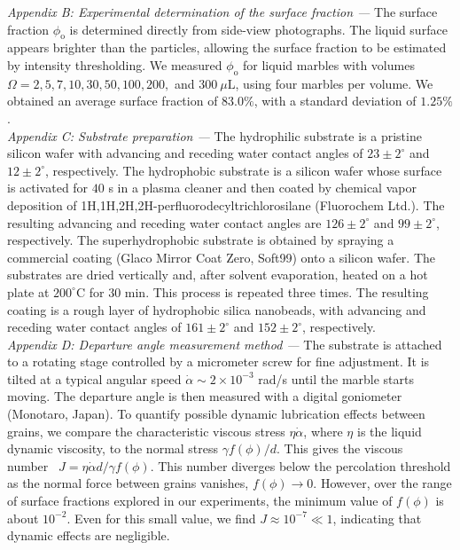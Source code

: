 \documentclass[twocolumn, prl,
 amsmath,amssymb,
 superscriptaddress,aps,
]{revtex4-2}
\begin{document}
\textit{Appendix B: Experimental determination of the surface fraction ---} The surface fraction $\phi_\mathrm{o}$ is determined directly from side-view photographs. The liquid surface appears brighter than the particles, allowing the surface fraction to be estimated by intensity thresholding. We measured $\phi_\mathrm{o}$ for liquid marbles with volumes $\Omega = 2, 5, 7, 10, 30, 50, 100, 200,$ and $300~\mu\mathrm{L}$, using four marbles per volume. We obtained an average surface fraction of $83.0\%$, with a standard deviation of $1.25\%$.
\\

\textit{Appendix C: Substrate preparation ---} The hydrophilic substrate is a pristine silicon wafer with advancing and receding water contact angles of $23 \pm 2^\circ$ and $12 \pm 2^\circ$, respectively. The hydrophobic substrate is a silicon wafer whose surface is activated for $40$ s in a plasma cleaner and then coated by chemical vapor deposition of 1H,1H,2H,2H-perfluorodecyltrichlorosilane (Fluorochem Ltd.). The resulting advancing and receding water contact angles are $126 \pm 2^\circ$ and $99 \pm 2^\circ$, respectively. The superhydrophobic substrate is obtained by spraying a commercial coating (Glaco Mirror Coat Zero, Soft99) onto a silicon wafer. The substrates are dried vertically and, after solvent evaporation, heated on a hot plate at $200^\circ$C for $30$ min. This process is repeated three times. The resulting coating is a rough layer of hydrophobic silica nanobeads, with advancing and receding water contact angles of $161 \pm 2^\circ$ and $152 \pm 2^\circ$, respectively.
\\

\textit{Appendix D: Departure angle measurement method ---} The substrate is attached to a rotating stage controlled by a micrometer screw for fine adjustment. It is tilted at a typical angular speed $\dot\alpha \sim 2\times10^{-3}$ rad/s until the marble starts moving. The departure angle is then measured with a digital goniometer (Monotaro, Japan). To quantify possible dynamic lubrication effects between grains, we compare the characteristic viscous stress $\eta \dot\alpha$, where $\eta$ is the liquid dynamic viscosity, to the normal stress $\gamma f(\phi)/d$. This gives the viscous number~\cite{boyer2011unifying} $J = \eta \dot\alpha d/\gamma f(\phi)$. This number diverges below the percolation threshold as the normal force between grains vanishes, $f(\phi) \rightarrow 0$. However, over the range of surface fractions explored in our experiments, the minimum value of $f(\phi)$ is about $10^{-2}$. Even for this small value, we find $J \approx 10^{-7} \ll 1$, indicating that dynamic effects are negligible.
\\
\end{document}
